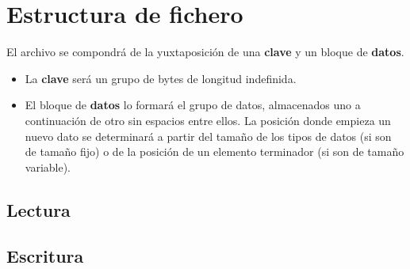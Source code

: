 \documentclass{article}
\begin{document}
\section{Estructura de fichero}

El archivo se compondrá de la yuxtaposición de una \textbf{clave} y un bloque de \textbf{datos}.

\begin{itemize}
	\item La \textbf{clave} será un grupo de bytes de longitud indefinida. %
	\item El bloque de \textbf{datos} lo formará el grupo de datos, almacenados uno a continuación de otro sin espacios entre ellos. La posición donde empieza un nuevo dato se determinará a partir del tamaño de los tipos de datos (si son de tamaño fijo) o de la posición de un elemento terminador (si son de tamaño variable).
\end{itemize}

\subsection{Lectura}

\subsection{Escritura}
\end{document}
